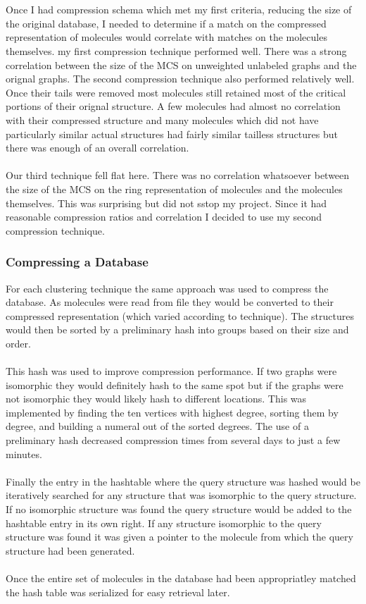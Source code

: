 \documentclass[DIV=calc, paper=a4, fontsize=12pt, twocolumn]{scrartcl}	 %
\begin{document}
\\\\
Once I had compression schema which met my first criteria, reducing the size of the original database, I needed to determine if a match on the compressed representation of molecules would correlate with matches on the molecules themselves. my first compression technique performed well. There was a strong correlation between the size of the MCS on unweighted unlabeled graphs and the orignal graphs. The second compression technique also performed relatively well. Once their tails were removed most molecules still retained most of the critical portions of their orignal structure. A few molecules had almost no correlation with their compressed structure and many molecules which did not have particularly similar actual structures had fairly similar tailless structures but there was enough of an overall correlation.
\\\\
Our third technique fell flat here. There was no correlation whatsoever between the size of the MCS on the ring representation of molecules and the molecules themselves. This was surprising but did not sstop my project. Since it had reasonable compression ratios and correlation I decided to use my second compression technique.

\subsubsection*{Compressing a Database}
For each clustering technique the same approach was used to compress the database. As molecules were read from file they would be converted to their compressed representation (which varied according to technique). The structures would then be sorted by a preliminary hash into groups based on their size and order. 
\\\\
This hash was used to improve compression performance. If two graphs were isomorphic they would definitely hash to the same spot but if the graphs were not isomorphic they would likely hash to different locations. This was implemented by finding the ten vertices with highest degree, sorting them by degree, and building a numeral out of the sorted degrees. The use of a preliminary hash decreased compression times from several days to just a few minutes.
\\\\
Finally the entry in the hashtable where the query structure was hashed would be iteratively searched for any structure that was isomorphic to the query structure. If no isomorphic structure was found the query structure would be added to the hashtable entry in its own right. If any structure isomorphic to the query structure was found it was given a pointer to the molecule from which the query structure had been generated. 
\\\\
Once the entire set of molecules in the database had been appropriatley matched the hash table was serialized for easy retrieval later.
\end{document}
